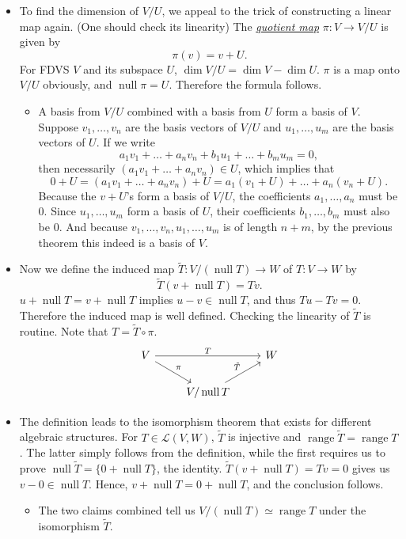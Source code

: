 \documentclass{article}
\newcommand{\df}[1]{\ul{\textit{#1}}}
\newcommand{\n}{\operatorname{null}}
\renewcommand{\r}{\operatorname{range}}
\renewcommand{\d}{\dim}
\newcommand{\LVW}{\mathcal{L}(V,W)}
\begin{document}
\begin{itemize}
\begin{itemize}
    \end{itemize}
    \item To find the dimension of $V/U$, we appeal to the trick of constructing a linear map again. (One should check its linearity) The \df{quotient map} $\pi: V \to V/U$ is given by $$\pi(v) = v+U.$$
    For FDVS $V$ and its subspace $U$, $\d V/U = \d V - \d U$. $\pi$ is a map onto $V/U$ obviously, and $\n \pi = U$. Therefore the formula follows.
    \begin{itemize}
        \item A basis from $V/U$ combined with a basis from $U$ form a basis of $V$. Suppose $v_1,\dots,v_n$ are the basis vectors of $V/U$ and $u_1,\dots,u_m$ are the basis vectors of $U$. If we write $$a_1v_1+\dots+a_nv_n + b_1u_1+\dots+b_mu_m = 0,$$ then necessarily $(a_1v_1+\dots+a_nv_n) \in U$, which implies that $$0+U = (a_1v_1+\dots+a_nv_n)+U = a_1(v_1+U)+\dots+a_n(v_n+U).$$ Because the $v+U$'s form a basis of $V/U$, the coefficients $a_1,\dots,a_n$ must be 0. Since $u_1,\dots,u_m$ form a basis of $U$, their coefficients $b_1,\dots,b_m$ must also be 0. And because $v_1,\dots,v_n,u_1,\dots,u_m$ is of length $n+m$, by the previous theorem this indeed is a basis of $V$.
    \end{itemize}
    \item Now we define the induced map $\tilde{T}: V/(\n T) \to W$ of $T: V \to W$ by $$\tilde{T}(v+\n T) = Tv.$$ $u + \n T = v + \n T$ implies $u - v \in \n T$, and thus $Tu-Tv = 0$. Therefore the induced map is well defined. Checking the linearity of $\tilde{T}$ is routine. Note that $T = \tilde{T} \circ \pi$.
    \begin{equation*}
            \begin{tikzcd}
                V \arrow[rr,"T"] \arrow[dr,"\pi"] && W \\
                & {V/\n T} \arrow[ur,"\tilde{T}"]
            \end{tikzcd}
        \end{equation*}
    \item The definition leads to the isomorphism theorem that exists for different algebraic structures. For $T \in \LVW$, $\tilde{T}$ is injective and $\r \tilde{T} = \r T$. The latter simply follows from the definition, while the first requires us to prove $\n \tilde{T} = \{0+\n T\}$, the identity. $\tilde{T}(v+\n T) = Tv = 0$ gives us $v-0 \in \n T$. Hence, $v+\n T = 0+\n T$, and the conclusion follows.
        \begin{itemize}
            \item The two claims combined tell us $V/(\n T) \simeq \r T$ under the isomorphism $\tilde{T}$.
        \end{itemize}
    \end{itemize}
    
\end{document}
